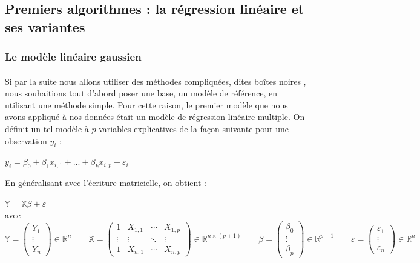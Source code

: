 \documentclass[14pt, openany]{article}
\begin{document}
\subsection{Premiers algorithmes : la régression linéaire et ses variantes}
\subsubsection{Le modèle linéaire gaussien}
\paragraph{}
Si par la suite nous allons utiliser des méthodes compliquées, dites \og boîtes noires \fg{} , nous souhaitions tout d'abord poser une base, un modèle de référence, en utilisant une méthode simple. Pour cette raison, le premier modèle que nous avons appliqué à nos données était un modèle de régression linéaire multiple. On définit un tel modèle à $p$ variables explicatives de la façon suivante pour une observation $y_i$ :
\begin{center}
$y_{i}=\beta_{0}+\beta_{1}x_{i,1}+...+\beta_{k}x_{i,p}+\varepsilon_{i}$
\end{center}
En généralisant avec l'écriture matricielle, on obtient :
\begin{center}
$\mathbb{Y}=\mathbb{X}\beta+\varepsilon$\\
\bigskip
avec $\mathbb{Y} = \begin{pmatrix} Y_1 \\ \vdots \\ Y_n \end{pmatrix} \in \mathbb{R}^n \qquad\mathbb{X} = \begin{pmatrix} 1 & X_{1,1} & \cdots & X_{1,p} \\ \vdots & \vdots & \ddots & \vdots \\ 1 & X_{n,1} & \cdots & X_{n,p} \end{pmatrix} \in \mathbb{R}^{n\times(p+1)} \qquad \mathbb{\beta} = \begin{pmatrix} \beta_0 \\ \vdots \\ \beta_p \end{pmatrix} \in \mathbb{R}^{p+1}\qquad \varepsilon = \begin{pmatrix} \varepsilon_1 \\ \vdots \\ \varepsilon_n \end{pmatrix} \in \mathbb{R}^n$\\
\end{center}
\end{document}
